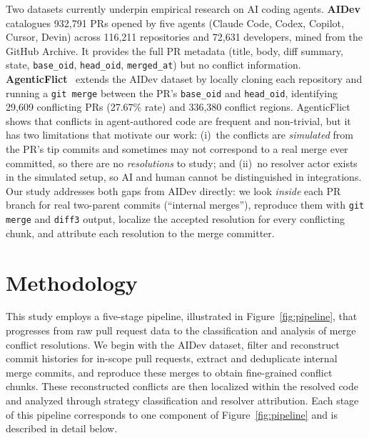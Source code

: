 \documentclass[sigconf,anonymous]{acmart}
\begin{document}
Two datasets currently underpin empirical research on AI coding agents. \textbf{AIDev}~\cite{liaidev2026} catalogues 932{,}791 PRs opened by five agents (Claude Code, Codex, Copilot, Cursor, Devin) across 116{,}211 repositories and 72{,}631 developers, mined from the GitHub Archive. It provides the full PR metadata (title, body, diff summary, state, \texttt{base\_oid}, \texttt{head\_oid}, \texttt{merged\_at}) but no conflict information. \textbf{AgenticFlict}~\cite{agenticflict2025} extends the AIDev dataset by locally cloning each repository and running a \texttt{git merge} between the PR's \texttt{base\_oid} and \texttt{head\_oid}, identifying 29{,}609 conflicting PRs (27.67\% rate) and 336{,}380 conflict regions. AgenticFlict shows that conflicts in agent-authored code are frequent and non-trivial, but it has two limitations that motivate our work: (i)~the conflicts are \emph{simulated} from the PR's tip commits and sometimes may not correspond to a real merge ever committed, so there are no \emph{resolutions} to study; and (ii)~no resolver actor exists in the simulated setup, so AI and human cannot be distinguished in integrations. Our study addresses both gaps from AIDev directly: we look \emph{inside} each PR branch for real two-parent commits (``internal merges''), reproduce them with \texttt{git merge} and \texttt{diff3} output, localize the accepted resolution for every conflicting chunk, and attribute each resolution to the merge committer.

\section{Methodology}
\label{sec:methodology}

This study employs a five-stage pipeline, illustrated in Figure~\ref{fig:pipeline}, that progresses from raw pull request data to the classification and analysis of merge conflict resolutions. We begin with the AIDev dataset, filter and reconstruct commit histories for in-scope pull requests, extract and deduplicate internal merge commits, and reproduce these merges to obtain fine-grained conflict chunks. These reconstructed conflicts are then localized within the resolved code and analyzed through strategy classification and resolver attribution. Each stage of this pipeline corresponds to one component of Figure~\ref{fig:pipeline} and is described in detail below.
\end{document}
